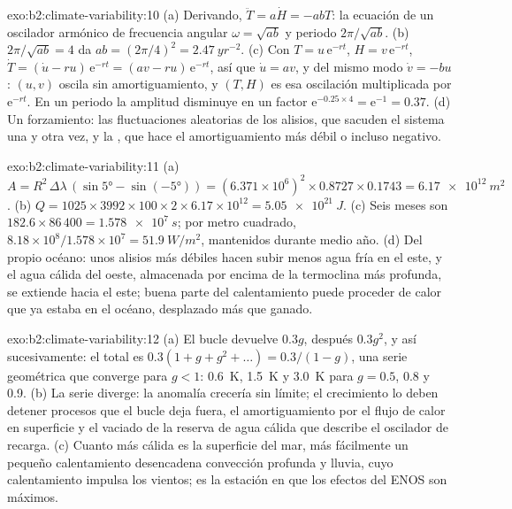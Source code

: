 \begin{solution}{exo:b2:climate-variability:10}
(a) Derivando, $\ddot T = a\dot H = -abT$: la ecuación de un oscilador armónico de frecuencia
angular $\omega = \sqrt{ab}$ y periodo $2\pi/\sqrt{ab}$. (b) $2\pi/\sqrt{ab} = 4$ da $ab =
(2\pi/4)^2 = \qty{2.47}{yr^{-2}}$. (c) Con $T = u\,\mathrm{e}^{-rt}$, $H = v\,\mathrm{e}^{-rt}$,
$\dot T = (\dot u - ru)\,\mathrm{e}^{-rt} = (av - ru)\,\mathrm{e}^{-rt}$, así que $\dot u = av$, y
del mismo modo $\dot v = -bu$: $(u, v)$ oscila sin amortiguamiento, y $(T, H)$ es esa oscilación
multiplicada por $\mathrm{e}^{-rt}$. En un periodo la amplitud disminuye en un factor $\mathrm{e}^{-0.25 \times
4} = \mathrm{e}^{-1} = 0.37$. (d) Un forzamiento: las fluctuaciones aleatorias de los alisios, que
sacuden el sistema una y otra vez, y la , que hace el amortiguamiento más débil o
incluso negativo.
\end{solution}

\begin{solution}{exo:b2:climate-variability:11}
(a) $A = R^2 \,\Delta\lambda\,(\sin\ang{5} - \sin(\ang{-5})) = (6.371 \times 10^6)^2 \times 0.8727
\times 0.1743 = \qty{6.17e12}{m^2}$. (b) $Q = 1025 \times 3992 \times 100 \times 2 \times 6.17
\times 10^{12} = \qty{5.05e21}{J}$. (c) Seis meses son $182.6 \times 86\,400 = \qty{1.578e7}{s}$;
por metro cuadrado, $8.18 \times 10^8/1.578 \times 10^7 = \qty{51.9}{W/m^2}$, mantenidos durante medio
año. (d) Del propio océano: unos alisios más débiles hacen subir menos agua fría en el este, y el agua cálida
del oeste, almacenada por encima de la termoclina más profunda, se extiende hacia el este; buena parte del calentamiento
puede proceder de calor que ya estaba en el océano, desplazado más que ganado.
\end{solution}

\begin{solution}{exo:b2:climate-variability:12}
(a) El bucle devuelve $0.3g$, después $0.3g^2$, y así sucesivamente: el total es $0.3(1 + g + g^2 + \dots) =
0.3/(1 - g)$, una serie geométrica que converge para $g < 1$: \qty{0.6}{K}, \qty{1.5}{K} y
\qty{3.0}{K} para $g = 0.5$, 0.8 y 0.9. (b) La serie diverge: la anomalía crecería sin
límite; el crecimiento lo deben detener procesos que el bucle deja fuera, el amortiguamiento por el flujo de calor
en superficie y el vaciado de la reserva de agua cálida que describe el oscilador de recarga. (c)
Cuanto más cálida es la superficie del mar, más fácilmente un pequeño calentamiento desencadena convección profunda y lluvia,
cuyo calentamiento impulsa los vientos; es la estación en que los efectos del ENOS son máximos.
\end{solution}

